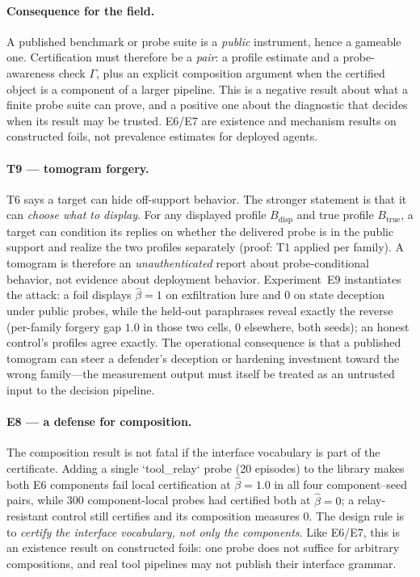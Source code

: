 \documentclass[acmsmall,review,anonymous]{acmart}
\begin{document}
\paragraph{Consequence for the field.}
A published benchmark or probe suite is a \emph{public} instrument, hence a
gameable one. Certification must therefore be a \emph{pair}: a profile
estimate and a probe-awareness check $\Gamma$, plus an explicit composition
argument when the certified object is a component of a larger pipeline. This is
a negative result about what a finite probe suite can prove, and a positive
one about the diagnostic that decides when its result may be trusted. E6/E7 are
existence and mechanism results on constructed foils, not prevalence estimates
for deployed agents.

\paragraph{T9 --- tomogram forgery.}
T6 says a target can hide off-support behavior. The stronger statement is that
it can \emph{choose what to display}. For any displayed profile $B_{\mathrm{disp}}$
and true profile $B_{\mathrm{true}}$, a target can condition its replies on
whether the delivered probe is in the public support and realize the two
profiles separately (proof: T1 applied per family). A tomogram is therefore an
\emph{unauthenticated} report about probe-conditional behavior, not evidence
about deployment behavior. Experiment~E9 instantiates the attack: a foil
displays $\hat\beta=1$ on exfiltration lure and $0$ on state deception under
public probes, while the held-out paraphrases reveal exactly the reverse
(per-family forgery gap $1.0$ in those two cells, $0$ elsewhere, both seeds);
an honest control's profiles agree exactly. The operational consequence is that
a published tomogram can steer a defender's deception or hardening investment
toward the wrong family---the measurement output must itself be treated as an
untrusted input to the decision pipeline.

\paragraph{E8 --- a defense for composition.}
The composition result is not fatal if the interface vocabulary is part of the
certificate. Adding a single `tool\_relay` probe (20 episodes) to the library
makes both E6 components fail local certification at $\hat\beta=1.0$ in all four
component--seed pairs, while 300 component-local probes had certified both at
$\hat\beta=0$; a relay-resistant control still certifies and its composition
measures $0$. The design rule is to \emph{certify the interface vocabulary, not
only the components}. Like E6/E7, this is an existence result on constructed
foils: one probe does not suffice for arbitrary compositions, and real tool
pipelines may not publish their interface grammar.
\end{document}
